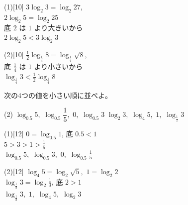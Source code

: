 \documentclass[14pt,dvipdfmx]{jsarticle}
\begin{document}
\noindent
\begin{minipage}[t]{0.49\linewidth}
\begin{answerbox}{(1)}[10]
  $3\log_{2} 3=\log_{2} 27$,\\
  $2\log_{2} 5=\log_{2} 25$\\
  底 $2$ は $1$ より大きいから\\
  \mbox{}\hfill $2\log_{2} 5 < 3\log_{2} 3$
\end{answerbox}
\end{minipage}\hfill
\begin{minipage}[t]{0.49\linewidth}
\begin{answerbox}{(2)}[10]
  $\tfrac{1}{2}\log_{\frac{1}{4}} 8=\log_{\frac{1}{4}}\sqrt{8}$,\\
  底 $\tfrac{1}{4}$ は $1$ より小さいから\\
  \mbox{}\hfill $\log_{\frac{1}{4}} 3 < \tfrac{1}{2}\log_{\frac{1}{4}} 8$
\end{answerbox}
\end{minipage}

\par\vspace{0.45em}\quad
次の4つの値を小さい順に並べよ。
\par\vspace{-0.25em}
\begin{tasks}[label=(\arabic*), label-width=1.6zw, item-indent=2zw, after-item-skip=0.06em](2)
  \task $\log_{0.5} 5$,\ $\log_{0.5} \dfrac{1}{5}$,\ $0$,\ $\log_{0.5} 3$
  \task $\log_{2} 3$,\ $\log_{4} 5$,\ $1$,\ $\log_{\frac{1}{2}} 3$
\end{tasks}

\noindent
\begin{minipage}[t]{0.49\linewidth}
\begin{answerbox}{(1)}[12]
  $0=\log_{0.5} 1$, 底 $0.5<1$\\
  $5>3>1>\frac{1}{5}$\\
  $\log_{0.5} 5$,\ $\log_{0.5} 3$,\ $0$,\ $\log_{0.5}\frac{1}{5}$
\end{answerbox}
\end{minipage}\hfill
\begin{minipage}[t]{0.49\linewidth}
\begin{answerbox}{(2)}[12]
  $\log_{4} 5=\log_{2}\sqrt{5}$,\ $1=\log_{2} 2$\\
  $\log_{\frac{1}{2}} 3=\log_{2}\frac{1}{3}$, 底 $2>1$\\
  $\log_{\frac{1}{2}} 3$,\ $1$,\ $\log_{4} 5$,\ $\log_{2} 3$
\end{answerbox}
\end{minipage}
\end{document}
